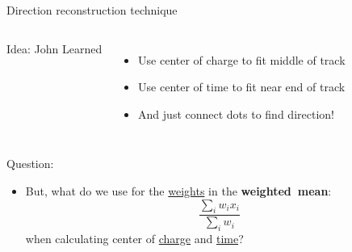\documentclass[14pt]{beamer}
\begin{document}
\begin{frame}{Direction reconstruction technique}
\begin{columns}[T]
\begin{block}{}

			{\footnotesize Idea: John Learned}
		\end{block}
		\begin{itemize}
			\item<2-> Use {\color{magenta}center of charge} to fit middle of
				track
			\item<3-> Use {\color{blue}center of time} to fit near end of track
			\item<4-> And just connect dots to find direction!
		\end{itemize}
	\end{columns}
\end{frame}

\begin{frame}{Question:}
	\begin{itemize}
		\item<2-> {
				But, what do we use for the \underline{weights} in the
				\textbf{weighted~mean}:
				\begin{equation*}
					\frac{\sum_{i} w_{i}x_{i}}{\sum_{i} w_{i}}
				\end{equation*}
				when calculating center of {\color{magenta}\underline{charge}} and
				{\color{blue}\underline{time}}?
			}
	\end{itemize}
\end{frame}
\end{document}
